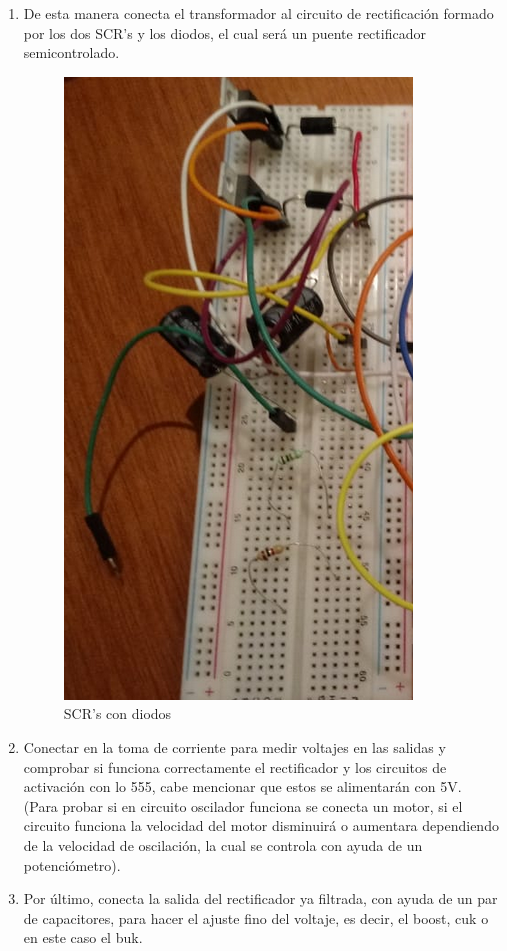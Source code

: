 \documentclass[letterpaper]{article}
\begin{document}
\begin{enumerate}
    \item De esta manera conecta el transformador al circuito de rectificación formado por los dos SCR's y los diodos, el cual será un puente rectificador semicontrolado.\\
    \begin{figure}[htbp]
        \centering
        \includegraphics[scale=.7]{IMG/scrsgeniales.PNG}
        \caption{SCR's con diodos}
        \label{fig:my_label}
    \end{figure}
    \item Conectar en la toma de corriente para medir voltajes en las salidas y comprobar si funciona correctamente el rectificador y los circuitos de activación con lo 555, cabe mencionar que estos se alimentarán con 5V. \\
    (Para probar si en circuito oscilador funciona se conecta un motor, si el circuito funciona la velocidad del motor disminuirá o aumentara dependiendo de la velocidad de oscilación, la cual se controla con ayuda de un potenciómetro).
   \item Por último, conecta la salida del rectificador ya filtrada, con ayuda de un par de capacitores, para hacer el ajuste fino del voltaje, es decir, el boost, cuk o en este caso el buk.
   
\end{enumerate}
\end{document}
